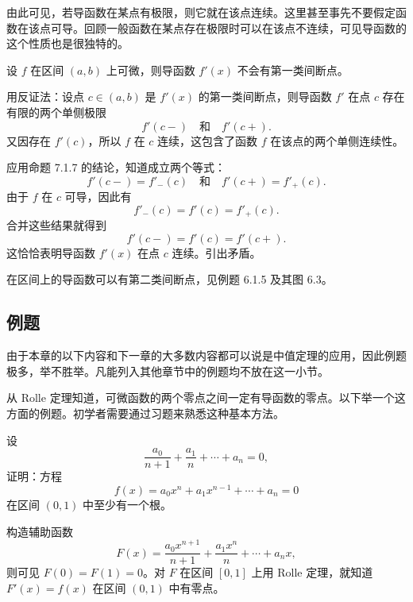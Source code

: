 \begin{xremark}
由此可见，若导函数在某点有极限，则它就在该点连续。这里甚至事先不要假定函数在该点可导。回顾一般函数在某点存在极限时可以在该点不连续，可见导函数的这个性质也是很独特的。
\end{xremark}

\begin{xexample}[7.1.1]
设 $f$ 在区间 $(a,b)$ 上可微，则导函数 $f'(x)$ 不会有第一类间断点。
\end{xexample}
\begin{xproof}
用反证法：设点 $c\in(a,b)$ 是 $f'(x)$ 的第一类间断点，则导函数 $f'$ 在点 $c$ 存在有限的两个单侧极限
\[
  f'(c-)\quad\text{和}\quad f'(c+).
\]
又因存在 $f'(c)$，所以 $f$ 在 $c$ 连续，这包含了函数 $f$ 在该点的两个单侧连续性。

应用命题 7.1.7 的结论，知道成立两个等式：
\[
  f'(c-)=f'_-(c)\quad\text{和}\quad f'(c+)=f'_+(c).
\]
由于 $f$ 在 $c$ 可导，因此有
\[
  f'_-(c)=f'(c)=f'_+(c).
\]
合并这些结果就得到
\[
  f'(c-)=f'(c)=f'(c+).
\]
这恰恰表明导函数 $f'(x)$ 在点 $c$ 连续。引出矛盾。
\end{xproof}

\begin{xremark}
在区间上的导函数可以有第二类间断点，见例题 6.1.5 及其图 6.3。
\end{xremark}

\subsection{例题}

由于本章的以下内容和下一章的大多数内容都可以说是中值定理的应用，因此例题极多，举不胜举。凡能列入其他章节中的例题均不放在这一小节。

从 Rolle 定理知道，可微函数的两个零点之间一定有导函数的零点。以下举一个这方面的例题。初学者需要通过习题来熟悉这种基本方法。

\begin{xexample}[7.1.2]
设
\[
  \frac{a_0}{n+1}+\frac{a_1}{n}+\cdots+a_n=0,
\]
证明：方程
\[
  f(x)=a_0x^n+a_1x^{n-1}+\cdots+a_n=0
\]
在区间 $(0,1)$ 中至少有一个根。
\end{xexample}
\begin{xproof}
构造辅助函数
\[
  F(x)=\frac{a_0x^{n+1}}{n+1}+\frac{a_1x^n}{n}+\cdots+a_nx,
\]
则可见 $F(0)=F(1)=0$。对 $F$ 在区间 $[0,1]$ 上用 Rolle 定理，就知道 $F'(x)=f(x)$ 在区间 $(0,1)$ 中有零点。
\end{xproof}

